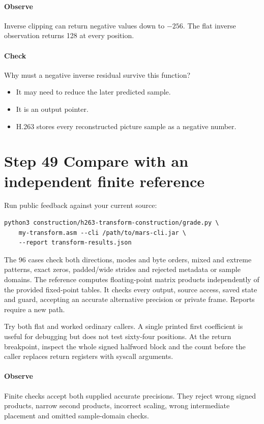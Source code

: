 \paragraph{Observe} Inverse clipping can return negative values down to $-256$.
The flat inverse observation returns 128 at every position.
\paragraph{Check} Why must a negative inverse residual survive this function?
\begin{itemize}
  \item[A.] It may need to reduce the later predicted sample.
  \item[B.] It is an output pointer.
  \item[C.] H.263 stores every reconstructed picture sample as a negative number.
\end{itemize}

\section{Step 49 Compare with an independent finite reference}\label{h263-transform-s09}
Run public feedback against your current source:
\begin{verbatim}
python3 construction/h263-transform-construction/grade.py \
    my-transform.asm --cli /path/to/mars-cli.jar \
    --report transform-results.json
\end{verbatim}
The 96 cases check both directions, modes and byte orders, mixed and extreme
patterns, exact zeros, padded/wide strides and rejected metadata or sample domains.
The reference computes floating-point matrix products independently of the
provided fixed-point tables. It checks every output, source access, saved state
and guard, accepting an accurate alternative precision or private frame.
Reports require a new path.

Try both flat and worked ordinary callers. A single printed first coefficient
is useful for debugging but does not test sixty-four positions. At the return
breakpoint, inspect the whole signed halfword block and the count before the
caller replaces return registers with syscall arguments.

\paragraph{Observe} Finite checks accept both supplied accurate precisions.
They reject wrong signed products, narrow second products, incorrect scaling,
wrong intermediate placement and omitted sample-domain checks.
\Needspace{8\baselineskip}
